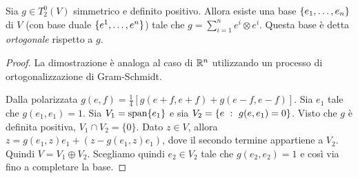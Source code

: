 \begin{proposition}
	Sia $g\in T^0_2(V)$ simmetrico e definito positivo. Allora esiste una base $\{\seqb en,\}$ di $V$ (con base duale $\{\seqa en,\}$) tale che $g = \sum_{i=1}^n e^i\otimes e^i$. Questa base è detta \emph{ortogonale} rispetto a $g$.
\end{proposition}
\begin{proof}
	La dimostrazione è analoga al caso di $\R^n$ utilizzando un processo di ortogonalizzazione di Gram-Schmidt.
	
	Dalla polarizzata $g(e,f) = \frac 14 [g(e+f,e+f) + g(e-f,e-f)]$.
	Sia $e_1$ tale che $g(e_1,e_1) = 1$. Sia $V_1 = \spanrm \{e_1\}$ e sia $V_2 = \{e \suchthat g(e,e_1) = 0\}$.
	Visto che $g$ è definita positiva, $V_1\cap V_2= \{0\}$. Dato $z\in V$, allora $z = g(e_1,z)e_1 + (z-g(e_1,z)e_1)$, dove il secondo termine appartiene a $V_2$. Quindi $V = V_1\oplus V_2$.
	Scegliamo quindi $e_2\in V_2$ tale che $g(e_2,e_2)=1$ e così via fino a completare la base.
\end{proof}


